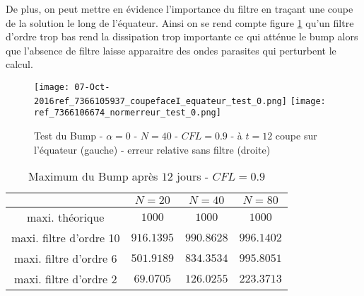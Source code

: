 De plus, on peut mettre en évidence l'importance du filtre en traçant une coupe de la solution le long de l'équateur. Ainsi on se rend compte figure \ref{table adv4} qu'un filtre d'ordre trop bas rend la dissipation trop importante ce qui atténue le bump alors que l'absence de filtre laisse apparaitre des ondes parasites qui perturbent le calcul.


\begin{figure}[ht]
\begin{center}
\texttt{[image: 07-Oct-2016ref\_7366105937\_coupefaceI\_equateur\_test\_0.png]}
\texttt{[image: ref\_7366106674\_normerreur\_test\_0.png]}
\caption{Test du Bump - $\alpha = 0$ - $N=40$ - $CFL=0.9$ - à $t=12$ coupe sur l'équateur (gauche) - erreur relative sans filtre (droite)}
\label{table adv4}
\end{center}
\end{figure}



\begin{table}[ht]
\begin{center}
\begin{tabular}{c|ccc}
\hline
 & $N=20$ &$N=40$ &$N=80$\\
\hline 
\hline
maxi. théorique & $1000$ & $1000$ & $1000$ \\ 
\hline 
maxi. filtre d'ordre 10 & $916.1395$& $990.8628$ & $996.1402$  \\ 
\hline 
maxi. filtre d'ordre 6 & $501.9189$& $834.3534$ & $995.8051$  \\ 
\hline 
maxi. filtre d'ordre 2 & $69.0705$ & $126.0255$ & $223.3713$  \\ 
\hline 
\end{tabular} 
\caption{Maximum du Bump après $12$ jours - $CFL=0.9$}
\end{center}
\end{table}





